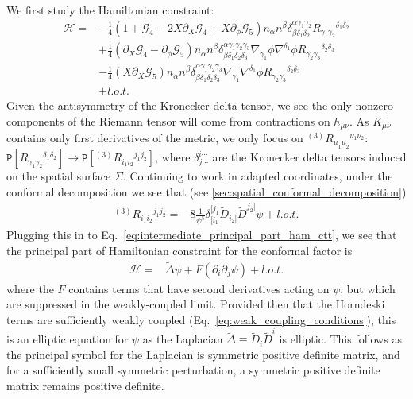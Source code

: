\documentclass{ws-ijmpd}
\begin{document}
We first study the Hamiltonian constraint:
\begin{align}
\label{eq:intermediate_principal_part_ham_ctt}
   \mathcal{H}
   =&
   -
   \frac{1}{4}\left(
      1 
      + 
      \mathcal{G}_4 
      - 
      2X\partial_X\mathcal{G}_4 
      + 
      X \partial_{\phi}\mathcal{G}_5
   \right)
   n_{\alpha}n^{\beta}
   \delta^{\alpha\gamma_1\gamma_2}_{\beta\delta_1\delta_2}
   R_{\gamma_1\gamma_2}{}^{\delta_1\delta_2}
   \nonumber\\
   &+
   \frac{1}{4}\left(
      \partial_X\mathcal{G}_4
      -
      \partial_{\phi}\mathcal{G}_5
   \right)
   n_{\alpha}n^{\beta}
   \delta^{\alpha\gamma_1\gamma_2\gamma_3}_{\beta\delta_1\delta_2\delta_3}
   \nabla_{\gamma_1}\phi\nabla^{\delta_1}\phi
   R_{\gamma_2\gamma_3}{}^{\delta_2\delta_3}
   \nonumber\\
   &-
   \frac{1}{4}
   \left(X\partial_X\mathcal{G}_5\right)
   n_{\alpha}n^{\beta}
   \delta^{\alpha\gamma_1\gamma_2\gamma_3}_{\beta\delta_1\delta_2\delta_3}
   \nabla_{\gamma_1}\nabla^{\delta_1}\phi
   R_{\gamma_2\gamma_3}{}^{\delta_2\delta_3}
   \nonumber\\
   &+
   l.o.t.
\end{align}
Given the antisymmetry of the Kronecker delta tensor, we see
the only nonzero components of the Riemann tensor will come
from contractions on $h_{\mu\nu}$.
As $K_{\mu\nu}$ contains only first derivatives of the metric,
we only focus on ${}^{(3)}R_{\mu_1\mu_2}{}^{\nu_1\nu_2}$:
$\mathtt{P}\left[R_{\gamma_1\gamma_2}{}^{\delta_1\delta_2}\right] 
\to
\mathtt{P}\left[{}^{(3)}R_{i_1i_2}{}^{j_1j_2}\right]
$,
where $\delta^{i\cdots}_{j\cdots}$ are the Kronecker delta tensors
induced on the spatial surface $\Sigma$.
Continuing to work in adapted coordinates, 
under the conformal decomposition we see that
(see \ref{sec:spatial_conformal_decomposition})
\begin{align}
   {}^{(3)}R_{i_1i_2}{}^{j_1j_2}
   =
   -
   8
   \frac{1}{\psi^5}
   \delta^{[j_1}_{[i_1}\tilde{D}_{i_2]}\tilde{D}^{j_2]}\psi
   +
   l.o.t.
\end{align}
Plugging this in to 
Eq.~\eqref{eq:intermediate_principal_part_ham_ctt},
we see that the principal part of Hamiltonian constraint
for the conformal factor is
\begin{align}
   \mathcal{H}
   =&
   \tilde{\Delta}\psi
   +
   F\left(\partial_i\partial_j\psi\right)
   +
   l.o.t.
\end{align}
where the $F$ contains terms that have second derivatives acting
on $\psi$, but which are suppressed in the weakly-coupled limit.
Provided then that the Horndeski terms are sufficiently weakly coupled 
(Eq.~\eqref{eq:weak_coupling_conditions}), 
this is an elliptic equation for $\psi$ as the
Laplacian $\tilde{\Delta}\equiv\tilde{D}_i\tilde{D}^i$ is 
elliptic. This follows as the principal symbol for the Laplacian is symmetric
positive definite matrix, and for a sufficiently 
small symmetric perturbation,
a symmetric positive definite matrix remains positive definite.
\end{document}

